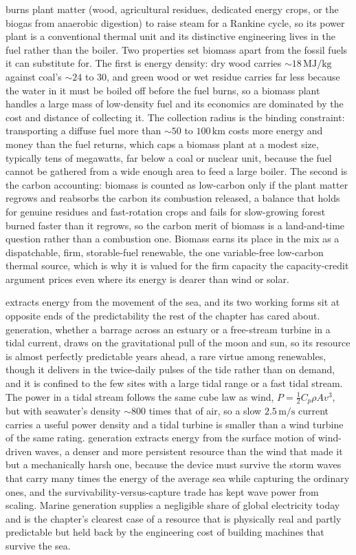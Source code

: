  burns plant matter (wood, agricultural residues,
dedicated energy crops, or the biogas from anaerobic digestion) to raise steam
for a Rankine cycle, so its power plant is a conventional thermal unit and its
distinctive engineering lives in the fuel rather than the boiler. Two
properties set biomass apart from the fossil fuels it can substitute for. The
first is energy density: dry wood carries $\sim 18\,\si{\mega\joule\per
\kilogram}$ against coal's $\sim 24$ to $30$, and green wood or wet residue
carries far less because the water in it must be boiled off before the fuel
burns, so a biomass plant handles a large mass of low-density fuel and its
economics are dominated by the cost and distance of collecting it. The
collection radius is the binding constraint: transporting a diffuse fuel more
than $\sim 50$ to $100\,\si{\kilo\meter}$ costs more energy and money than the
fuel returns, which caps a biomass plant at a modest size, typically tens of
megawatts, far below a coal or nuclear unit, because the fuel cannot be
gathered from a wide enough area to feed a large boiler. The second is the
carbon accounting: biomass is counted as low-carbon only if the plant matter
regrows and reabsorbs the carbon its combustion released, a balance that holds
for genuine residues and fast-rotation crops and fails for slow-growing forest
burned faster than it regrows, so the carbon merit of biomass is a
land-and-time question rather than a combustion one. Biomass earns its place in
the mix as a dispatchable, firm, storable-fuel renewable, the one variable-free
low-carbon thermal source, which is why it is valued for the firm capacity the
capacity-credit argument prices even where its energy is dearer than wind or
solar.

 extracts energy from the movement of the sea, and
its two working forms sit at opposite ends of the predictability the rest of the
chapter has cared about.  generation, whether a barrage across
an estuary or a free-stream turbine in a tidal current, draws on the
gravitational pull of the moon and sun, so its resource is almost perfectly
predictable years ahead, a rare virtue among renewables, though it delivers in
the twice-daily pulses of the tide rather than on demand, and it is confined to
the few sites with a large tidal range or a fast tidal stream. The power in a
tidal stream follows the same cube law as wind, $P = \tfrac12 C_p \rho A v^3$,
but with seawater's density $\sim 800$ times that of air, so a slow
$2.5\,\si{\meter\per\second}$ current carries a useful power density and a
tidal turbine is smaller than a wind turbine of the same rating. 
generation extracts energy from the surface motion of wind-driven waves, a
denser and more persistent resource than the wind that made it but a mechanically
harsh one, because the device must survive the storm waves that carry many times
the energy of the average sea while capturing the ordinary ones, and the
survivability-versus-capture trade has kept wave power from scaling. Marine
generation supplies a negligible share of global electricity today and is the
chapter's clearest case of a resource that is physically real and partly
predictable but held back by the engineering cost of building machines that
survive the sea.

